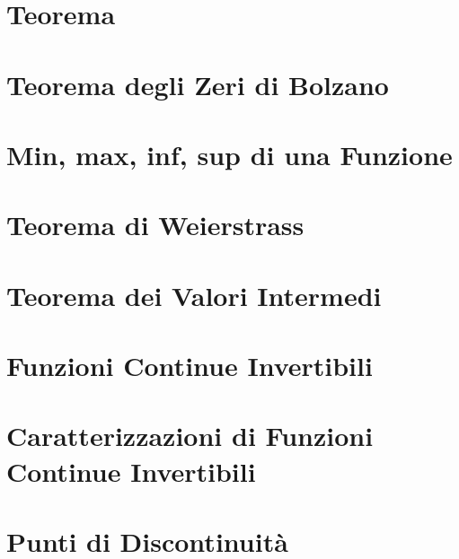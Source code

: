 \documentclass[a4paper, twoside, italian, 11pt]{book}
\begin{document}



\section{Teorema}




\section{Teorema degli Zeri di Bolzano}




\section{Min, max, inf, sup di una Funzione}




\section{Teorema di Weierstrass}




\section{Teorema dei Valori Intermedi}




\section{Funzioni Continue Invertibili}




\section{Caratterizzazioni di Funzioni Continue Invertibili}




\section{Punti di Discontinuità}
\end{document}
